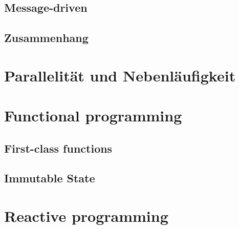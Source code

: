 \subsection{Message-driven}\label{subsec:messagedriven}




\pagebreak

\subsection{Zusammenhang}


%
%
%

\section{Parallelität und Nebenläufigkeit}





\section{Functional programming}

\subsection{First-class functions}
\subsection{Immutable State}

\section{Reactive programming}

